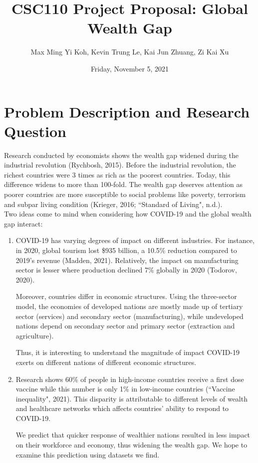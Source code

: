 \documentclass[fontsize=11pt]{article}
\title{CSC110 Project Proposal: Global Wealth Gap}
\author{Max Ming Yi Koh, Kevin Trung Le, Kai Jun Zhuang, Zi Kai Xu}
\date{Friday, November 5, 2021}
\begin{document}
\maketitle

\section*{Problem Description and Research Question}
Research conducted by economists shows the wealth gap widened during the industrial revolution (Rychbosh, 2015). Before the industrial revolution, the richest countries were 3 times as rich as the poorest countries. Today, this difference widens to more than 100-fold. The wealth gap deserves attention as poorer countries are more susceptible to social problems like poverty, terrorism and subpar living condition (Krieger, 2016; ``Standard of Living", n.d.).
\\

\noindent Two ideas come to mind when considering how COVID-19 and the global wealth gap interact:

\begin{enumerate}
    \item COVID-19 has varying degrees of impact on different industries. For instance, in 2020, global tourism lost \$935 billion, a 10.5\% reduction compared to 2019’s revenue (Madden, 2021). Relatively, the impact on manufacturing sector is lesser where production declined 7\% globally in 2020 (Todorov, 2020).

    Moreover, countries differ in economic structures. Using the three-sector model, the economies of developed nations are mostly made up of tertiary sector (services) and secondary sector (manufacturing), while undeveloped nations depend on secondary sector and primary sector (extraction and agriculture).

    Thus, it is interesting to understand the magnitude of impact COVID-19 exerts on different nations of different economic structures.

    \item Research shows 60\% of people in high-income countries receive a first dose vaccine while this number is only 1\% in low-income countries (``Vaccine inequality", 2021). This disparity is attributable to different levels of wealth and healthcare networks which affects countries’ ability to respond to COVID-19.

    We predict that quicker response of wealthier nations resulted in less impact on their workforce and economy, thus widening the wealth gap. We hope to examine this prediction using datasets we find.
\end{enumerate}
\end{document}
